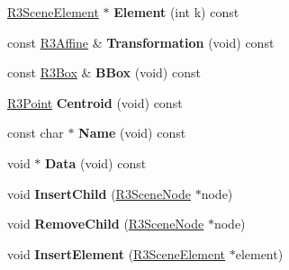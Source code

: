 \begin{DoxyCompactItemize}
\item 
\hyperlink{class_r3_scene_element}{R3\+Scene\+Element} $\ast$ {\bfseries Element} (int k) const \hypertarget{class_r3_scene_node_aca7f953a1e41fd37bdf99ff6058629dd}{}\label{class_r3_scene_node_aca7f953a1e41fd37bdf99ff6058629dd}

\item 
const \hyperlink{class_r3_affine}{R3\+Affine} \& {\bfseries Transformation} (void) const \hypertarget{class_r3_scene_node_abee177e204ffbb9577bc2a0c46fb3589}{}\label{class_r3_scene_node_abee177e204ffbb9577bc2a0c46fb3589}

\item 
const \hyperlink{class_r3_box}{R3\+Box} \& {\bfseries B\+Box} (void) const \hypertarget{class_r3_scene_node_adf13995eb89320c2723baf0d1c316d74}{}\label{class_r3_scene_node_adf13995eb89320c2723baf0d1c316d74}

\item 
\hyperlink{class_r3_point}{R3\+Point} {\bfseries Centroid} (void) const \hypertarget{class_r3_scene_node_ad6aa3d71e3834322e209df793e4b6da5}{}\label{class_r3_scene_node_ad6aa3d71e3834322e209df793e4b6da5}

\item 
const char $\ast$ {\bfseries Name} (void) const \hypertarget{class_r3_scene_node_a422e7fe4340827862dc392d7032bf53d}{}\label{class_r3_scene_node_a422e7fe4340827862dc392d7032bf53d}

\item 
void $\ast$ {\bfseries Data} (void) const \hypertarget{class_r3_scene_node_af469f2f10e46f901d0630c9a5d373a7f}{}\label{class_r3_scene_node_af469f2f10e46f901d0630c9a5d373a7f}

\item 
void {\bfseries Insert\+Child} (\hyperlink{class_r3_scene_node}{R3\+Scene\+Node} $\ast$node)\hypertarget{class_r3_scene_node_a61a321a295d3e1b7f92de440e02d2b15}{}\label{class_r3_scene_node_a61a321a295d3e1b7f92de440e02d2b15}

\item 
void {\bfseries Remove\+Child} (\hyperlink{class_r3_scene_node}{R3\+Scene\+Node} $\ast$node)\hypertarget{class_r3_scene_node_aa9c1d29822046d9aead3a0b086c47ff1}{}\label{class_r3_scene_node_aa9c1d29822046d9aead3a0b086c47ff1}

\item 
void {\bfseries Insert\+Element} (\hyperlink{class_r3_scene_element}{R3\+Scene\+Element} $\ast$element)\hypertarget{class_r3_scene_node_abddac0c7c6069193ea0d1b45a1aa498b}{}\label{class_r3_scene_node_abddac0c7c6069193ea0d1b45a1aa498b}


\end{DoxyCompactItemize}
